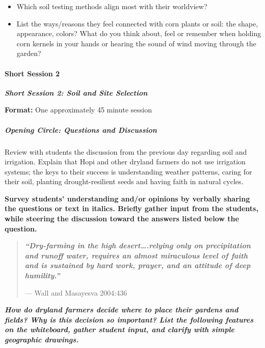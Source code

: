 \documentclass[12pt,]{article}
\providecommand{\tightlist}{%
  \setlength{\itemsep}{0pt}\setlength{\parskip}{0pt}}
\let\oldparagraph\paragraph
\renewcommand{\paragraph}[1]{\oldparagraph{#1}\mbox{}}
\let\oldsubparagraph\subparagraph
\renewcommand{\subparagraph}[1]{\oldsubparagraph{#1}\mbox{}}
\begin{document}
\begin{itemize}
\tightlist
\item
  Which soil testing methods align most with their worldview?
\item
  List the ways/reasons they feel connected with corn plants or soil: the shape, appearance, colors? What do you think about, feel or remember when holding corn kernels in your hands or hearing the sound of wind moving through the garden?
\end{itemize}

\hypertarget{short-session-2-2}{%
\paragraph{Short Session 2}\label{short-session-2-2}}

\textbf{\emph{Short Session 2: Soil and Site Selection}}

\textbf{Format:} One approximately 45 minute session

\hypertarget{opening-circle-questions-and-discussion-2}{%
\subparagraph{Opening Circle: Questions and Discussion}\label{opening-circle-questions-and-discussion-2}}

Review with students the discussion from the previous day regarding soil and irrigation. Explain that Hopi and other dryland farmers do not use irrigation systems; the keys to their success is understanding weather patterns, caring for their soil, planting drought-resilient seeds and having faith in natural cycles.

\textbf{Survey students' understanding and/or opinions by verbally sharing the questions or text in italics. Briefly gather input from the students, while steering the discussion toward the answers listed below the question.}

\begin{quote}
\textbf{\emph{``Dry-farming in the high desert\ldots.relying only on precipitation and runoff water, requires an almost miraculous level of faith and is sustained by hard work, prayer, and an attitude of deep humility.''}}

--- Wall and Masayesva 2004:436
\end{quote}

\textbf{\emph{How do dryland farmers decide where to place their gardens and fields? Why is this decision so important? List the following features on the whiteboard, gather student input, and clarify with simple geographic drawings. }}
\end{document}
